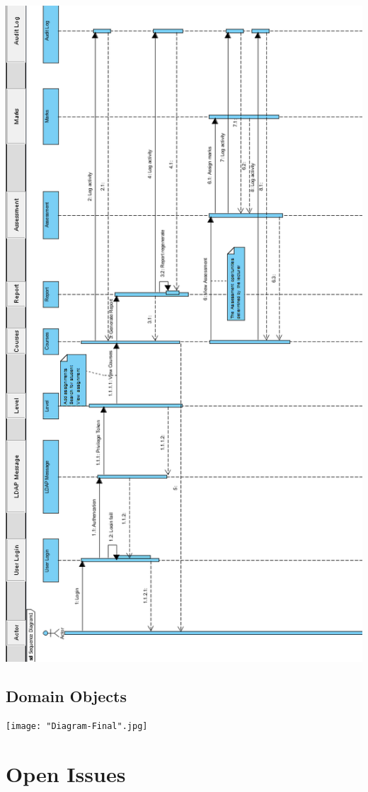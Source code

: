 \documentclass[10pt,a4paper]{article}
\begin{document}
\includegraphics[scale=0.75]{Sequence.png}

\subsection{Domain Objects}


\texttt{[image: "Diagram-Final".jpg]}

\section{Open Issues}
\end{document}
